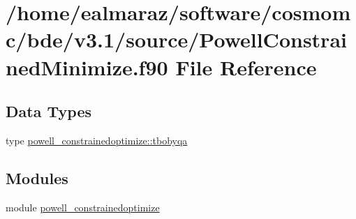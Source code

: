 \hypertarget{PowellConstrainedMinimize_8f90}{}\section{/home/ealmaraz/software/cosmomc/bde/v3.1/source/\+Powell\+Constrained\+Minimize.f90 File Reference}
\label{PowellConstrainedMinimize_8f90}
\subsection*{Data Types}
\begin{DoxyCompactItemize}
\item 
type \mbox{\hyperlink{structpowell__constrainedoptimize_1_1tbobyqa}{powell\+\_\+constrainedoptimize\+::tbobyqa}}
\end{DoxyCompactItemize}
\subsection*{Modules}
\begin{DoxyCompactItemize}
\item 
module \mbox{\hyperlink{namespacepowell__constrainedoptimize}{powell\+\_\+constrainedoptimize}}
\end{DoxyCompactItemize}
